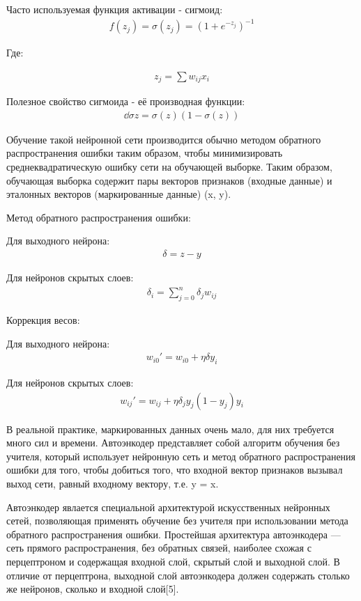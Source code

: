\documentclass[12pt]{article}
\begin{document}
Часто используемая функция активации - сигмоид:
  \begin{align}
	f(z_j)=\sigma(z_j)=(1+e^{-z_j})^{-1}
  \end{align}

Где:

  \begin{align}
	z_j=\sum{{w_{ij}}{x_i}}
  \end{align}

Полезное свойство сигмоида - её производная функции:
  \begin{align}
	\dd{\sigma}z=\sigma(z)(1-\sigma(z))
  \end{align}

Обучение такой нейронной сети производится обычно методом обратного распространения ошибки таким образом, чтобы минимизировать среднеквадратическую ошибку сети на обучающей выборке. Таким образом, обучающая выборка содержит пары векторов признаков (входные данные) и эталонных векторов (маркированные данные) {(x, y)}.

Метод обратного распространения ошибки:

Для выходного нейрона:
  \begin{align}
	\delta=z-y
  \end{align}

Для нейронов скрытых слоев:
  \begin{align}
	\delta_i=\sum_{j=0}^n \delta_j w_{ij}
  \end{align}

Коррекция весов:

Для выходного нейрона:
  \begin{align}
	w_{i0}'=w_{i0}+\eta\delta y_i
  \end{align}

Для нейронов скрытых слоев:
  \begin{align}
	w_{ij}'=w_{ij}+\eta\delta_j y_j(1-y_j)y_i
  \end{align}

В реальной практике, маркированных данных очень мало, для них требуется много сил и времени. Автоэнкодер представляет собой алгоритм обучения без учителя, который использует нейронную сеть и метод обратного распространения ошибки для того, чтобы добиться того, что входной вектор признаков вызывал выход сети, равный входному вектору, т.е. y = x.

Автоэнкодер явлается специальной архитектурой искусственных нейронных сетей, позволяющая применять обучение без учителя при использовании метода обратного распространения ошибки. Простейшая архитектура автоэнкодера — сеть прямого распространения, без обратных связей, наиболее схожая с перцептроном и содержащая входной слой, скрытый слой и выходной слой. В отличие от перцептрона, выходной слой автоэнкодера должен содержать столько же нейронов, сколько и входной слой[5].
\end{document}
